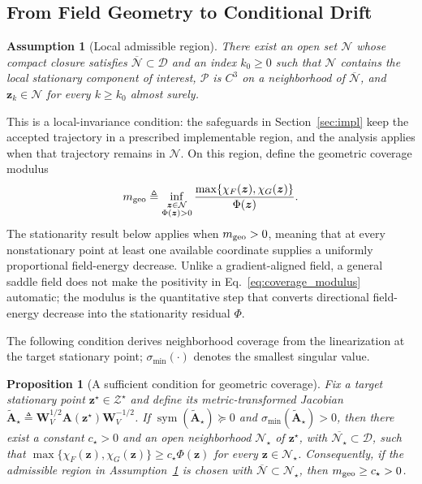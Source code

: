 \documentclass{article}
\newtheorem{proposition}{Proposition}
\newtheorem{assumption}{Assumption}
\theoremstyle{remark}
\newcommand{\sym}{\operatorname{sym}}
\newcommand{\cD}{\mathcal{D}}
\newcommand{\cN}{\mathcal{N}}
\newcommand{\bz}{\boldsymbol{z}}
\newcommand{\bW}{\boldsymbol{W}}
\newcommand{\bA}{\boldsymbol{A}}
\newcommand{\cP}{\mathcal{P}}
\begin{document}
\subsection{From Field Geometry to Conditional Drift}\label{subsec:pathwise}

\begin{assumption}[Local admissible region]\label{ass:local}
There exist an open set $\cN$ whose compact closure satisfies $\overline{\cN}\subset\cD$ and an index $k_{0}\ge0$ such that $\cN$ contains the local stationary component of interest, $\cP$ is $C^3$ on a neighborhood of $\overline{\cN}$, and $\bz_k\in\cN$ for every $k\ge k_0$ almost surely.
\end{assumption}

This is a local-invariance condition: the safeguards in Section~\ref{sec:impl} keep the accepted trajectory in a prescribed implementable region, and the analysis applies when that trajectory remains in $\cN$.
On this region, define the geometric coverage modulus
\begin{equation}\label{eq:coverage_modulus}
m_{\rm geo}
\triangleq
\inf_{\substack{\bz\in\cN\\\Phi(\bz)>0}}
\frac{\max\{\chi_F(\bz),\chi_G(\bz)\}}{\Phi(\bz)}.
\end{equation}
The stationarity result below applies when $m_{\rm geo}>0$, meaning that at every nonstationary point at least one available coordinate supplies a uniformly proportional field-energy decrease.
Unlike a gradient-aligned field, a general saddle field does not make the positivity in Eq.~\eqref{eq:coverage_modulus} automatic; the modulus is the quantitative step that converts directional field-energy decrease into the stationarity residual $\Phi$.

The following condition derives neighborhood coverage from the linearization at the target stationary point; $\sigma_{\min}(\cdot)$ denotes the smallest singular value.
\begin{proposition}[A sufficient condition for geometric coverage]\label{prop:coverage_sufficient}
Fix a target stationary point $\bz^\star\in\mathcal Z^\star$ and define its metric-transformed Jacobian $\widetilde{\bA}_\star\triangleq\bW_V^{1/2}\bA(\bz^\star)\bW_V^{-1/2}$.
If $\sym(\widetilde{\bA}_\star)\succeq0$ and $\sigma_{\min}(\widetilde{\bA}_\star)>0$, then there exist a constant $c_\star>0$ and an open neighborhood $\cN_\star$ of $\bz^\star$, with $\overline{\cN_\star}\subset\cD$, such that
\(\max\{\chi_F(\bz),\chi_G(\bz)\}\ge c_\star\Phi(\bz)\) for every $\bz\in\cN_\star$.
Consequently, if the admissible region in Assumption~\ref{ass:local} is chosen with $\overline{\cN}\subset\cN_\star$, then $m_{\rm geo}\ge c_\star>0$.
\end{proposition}
\end{document}
